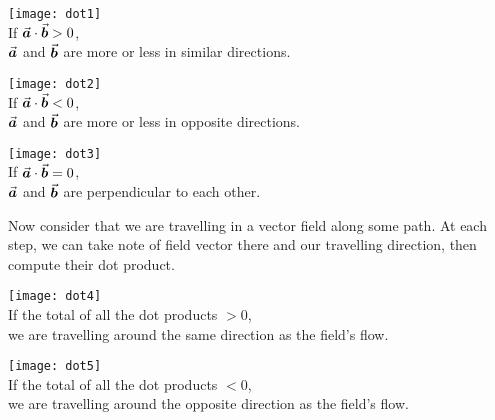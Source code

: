 \documentclass[class=article, crop=false, 12pt]{standalone}
\begin{document}
\begin{center}
    \begin{minipage}{0.27\linewidth}
        \centering
        \texttt{[image: dot1]}\\[2ex]
        If $\va*{a}\cdot\va*{b}>0$,\\
        $\va*{a}$ and $\va*{b}$ are 
        more or less in similar directions.
    \end{minipage}
    \quad\vline\quad
    \begin{minipage}{0.28\linewidth}
        \centering
        \texttt{[image: dot2]}\\
        If $\va*{a}\cdot\va*{b}<0$,\\
        $\va*{a}$ and $\va*{b}$ are 
        more or less in opposite directions.
    \end{minipage}
    \quad\vline\quad
    \begin{minipage}{0.30\linewidth}
        \centering
        \texttt{[image: dot3]}\\[1.5ex]
        If $\va*{a}\cdot\va*{b}=0$,\\
        $\va*{a}$ and $\va*{b}$ are 
        perpendicular to each other.
    \end{minipage}
\end{center}

Now consider that we are travelling in a vector field along some path.
At each step, 
we can take note of field vector there and our travelling direction,
then compute their dot product.

\begin{center}
    \begin{minipage}{0.45\linewidth}
        \centering
        \texttt{[image: dot4]}\\
        If the total of all the dot products $>0$,\\ 
        we are travelling around the same direction as the field's flow.
    \end{minipage}
    \quad\vline\quad
    \begin{minipage}{0.45\linewidth}
        \centering
        \texttt{[image: dot5]}\\
        If the total of all the dot products $<0$,\\
        we are travelling around the opposite direction as the field's flow.
    \end{minipage}
\end{center}
\end{document}
